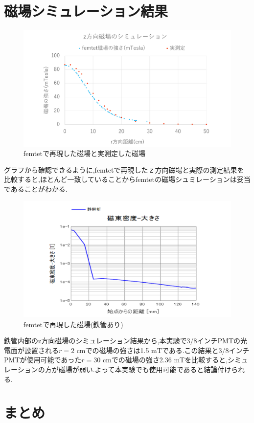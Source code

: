 \section{磁場シミュレーション結果}
\begin{figure}[h]
	\centering
		\includegraphics[width=16cm]{fig/iguchi/magnetgraph2.pdf}
	\caption{femtetで再現した磁場と実測定した磁場}
	\label{magnetgraph2}
\end{figure}

グラフから確認できるように,femtetで再現したｚ方向磁場と実際の測定結果を比較すると,ほとんど一致していることからfemtetの磁場シュミレーションは妥当であることがわかる.
\begin{figure}[h]
	\centering
		\includegraphics[width=20cm]{fig/iguchi/maggraphinFe.pdf}
	\caption{femtetで再現した磁場(鉄管あり)}
	\label{maggraphinFe}
\end{figure}
鉄管内部のz方向磁場のシミュレーション結果から,本実験で3/8インチPMTの光電面が設置される$r=2$ cmでの磁場の強さは1.5 mTである.この結果と3/8インチPMTが使用可能であった$r=30$ cmでの磁場の強さ2.36 mTを比較すると,シミュレーションの方が磁場が弱い.よって本実験でも使用可能であると結論付けられる.

\section{まとめ}




